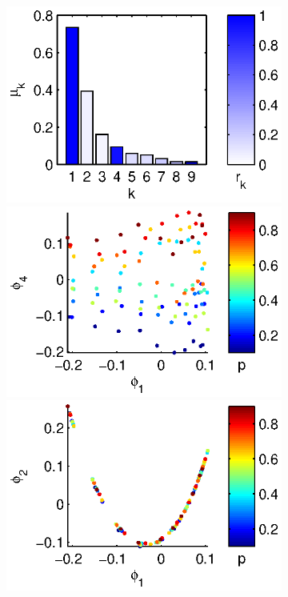 \documentclass[3p]{elsarticle}
\begin{document}
\begin{figure}[t]
\begin{subfigure}[t]{1.5in}
\caption{}
\end{subfigure}
%
\begin{subfigure}[t]{2in}
\centering
\includegraphics[height=\figheight]{chemotaxis3_evals}
\includegraphics[height=\figheight]{chemotaxis3_embed_good}
\includegraphics[height=\figheight]{chemotaxis3_embed_bad}

\end{subfigure}
\end{figure}
\end{document}
